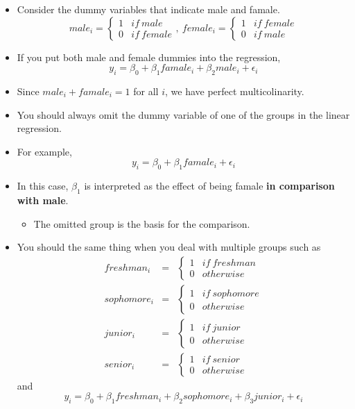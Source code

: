 \documentclass[]{book}
\providecommand{\tightlist}{%
  \setlength{\itemsep}{0pt}\setlength{\parskip}{0pt}}
\begin{document}
\begin{itemize}
\tightlist
\item
  Consider the dummy variables that indicate male and famale. \[
  male_{i}=\begin{cases}
  1 & if\ male\\
  0 & if\ female
  \end{cases},\  
  female_{i}=\begin{cases}
  1 & if\ female\\
  0 & if\ male
  \end{cases}
  \]
\item
  If you put both male and female dummies into the regression, \[
  y_i = \beta_0 + \beta_1 famale_i + \beta_2 male_i + \epsilon_i
  \]
\item
  Since \(male_i + famale_i = 1\) for all \(i\), we have perfect
  multicolinarity.
\item
  You should always omit the dummy variable of one of the groups in the
  linear regression.
\item
  For example, \[
  y_i = \beta_0 + \beta_1 famale_i +  \epsilon_i
  \]
\item
  In this case, \(\beta_1\) is interpreted as the effect of being famale
  \textbf{in comparison with male}.

  \begin{itemize}
  \tightlist
  \item
    The omitted group is the basis for the comparison.
  \end{itemize}
\item
  You should the same thing when you deal with multiple groups such as
  \[
  \begin{aligned}
  freshman_{i}&=&\begin{cases}
  1 & if\ freshman\\
  0 & otherwise
  \end{cases} \\
  sophomore_{i}&=&\begin{cases}
  1 & if\ sophomore\\
  0 & otherwise
  \end{cases} \\
  junior_{i}&=&\begin{cases}
  1 & if\ junior\\
  0 & otherwise
  \end{cases} \\
  senior_{i}&=&\begin{cases}
  1 & if\ senior\\
  0 & otherwise
  \end{cases} 
  \end{aligned}
  \] and \[
  y_i = \beta_0 + \beta_1 freshman_i + \beta_2 sophomore_i + \beta_3 junior_i +  \epsilon_i
  \]
\end{itemize}
\end{document}
